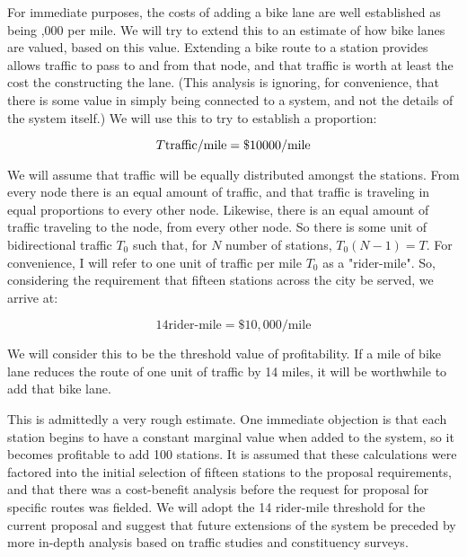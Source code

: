 \documentclass{article}
\begin{document}
For immediate purposes, the costs of adding a bike lane are well established as being ,000 per mile.  We will try to extend this to an estimate of how bike lanes are valued, based on this value.  Extending a bike route to a station provides allows traffic to pass to and from that node, and that traffic is worth at least the cost the constructing the lane.  (This analysis is ignoring, for convenience, that there is some value in simply being connected to a system, and not the details of the system itself.)  We will use this to try to establish a proportion: 

\begin{equation*} T \text{traffic} / \text{mile} = \text{\textdollar} 10000 / \text{mile} \end{equation*} 

We will assume that traffic will be equally distributed amongst the stations.  From every node there is an equal amount of traffic, and that traffic is traveling in equal proportions to every other node.  Likewise, there is an equal amount of traffic traveling to the node, from every other node.  So there is some unit of bidirectional traffic $T_0$ such that, for $N$ number of stations, $T_0 \left( N - 1 \right) = T$.  For convenience, I will refer to one unit of traffic per mile $T_0$ as a "rider-mile".  So, considering the requirement that fifteen stations across the city be served, we arrive at: 

\begin{equation*} 14 \text{rider-mile} = \$10,000 /\text{mile} \end{equation*} 

We will consider this to be the threshold value of profitability.  If a mile of bike lane reduces the route of one unit of traffic by 14 miles, it will be worthwhile to add that bike lane.  

This is admittedly a very rough estimate.  One immediate objection is that each station begins to have a constant marginal value when added to the system, so it becomes profitable to add 100 stations.  It is assumed that these calculations were factored into the initial selection of fifteen stations to the proposal requirements, and that there was a cost-benefit analysis before the request for proposal for specific routes was fielded.  We will adopt the 14 rider-mile threshold for the current proposal and suggest that future extensions of the system be preceded by more in-depth analysis based on traffic studies and constituency surveys.
\end{document}
